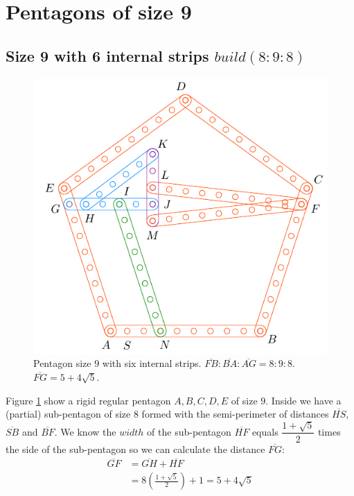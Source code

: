 \documentclass[11pt]{article}
\begin{document}

\section{Pentagons of size 9}

\subsection{Size 9 with 6 internal strips $build(8:9:8)$}

\begin{figure}[H]
 \centering
 \includegraphics[scale=0.95]{9/penta9a}
 \caption{Pentagon size 9 with six internal strips. $\overline{FB}:\overline{BA}:\overline{AG} = 8:9:8$. $\overline{FG}=5+4\sqrt5$. }
 \label{fig:penta9a}
\end{figure}

Figure \ref{fig:penta9a} show a rigid regular pentagon $A,B,C,D,E$ of size $9$. Inside we have a (partial) sub-pentagon of size $8$ formed with the semi-perimeter of distances $\overline{HS}$, $\overline{SB}$ and $\overline{BF}$. We know the $width$ of the sub-pentagon $\overline{HF}$ equals $\dfrac{1+\sqrt5}2$ times the side of the sub-pentagon so we can calculate the distance $\overline{FG}$:
\begin{align}
\overline{GF} &= \overline{GH} + \overline{HF} \nonumber\\
 &= 8\left(\frac{1+\sqrt5}2\right) + 1 = 5 + 4\sqrt5
\end{align}
\end{document}
